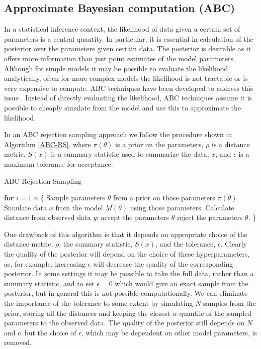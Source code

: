 \documentclass[twocolumn]{biophys}
\begin{document}
\subsection{Approximate Bayesian computation (ABC)}
In a statistical inference context, the likelihood of data given a certain set of parameters is a central quantity. 
In particular, it is essential in calculation of the posterior over the parameters given certain data. 
The posterior is desirable as it offers more information than just point estimates of the model parameters.
Although for simple models it may be possible to evaluate the likelihood analytically, often for more complex models the likelihood is not tractable or is very expensive to compute.  
ABC techniques have been developed to address this issue \cite{beaumont2002approximate}.
Instead of directly evaluating the likelihood, ABC techniques assume it is possible to cheaply simulate from the model and use this to approximate the likelihood.

In an ABC rejection sampling approach we follow the procedure shown in Algorithm \ref{ABC-RS}, where $\pi(\theta)$ is a prior on the parameters, $\rho$ is a distance metric, $S(x)$ is a summary statistic used to summarize the data, $x$, and $\epsilon$ is a maximum tolerance for acceptance. 
\begin{algorithm}
\caption{ABC Rejection Sampling}\label{ABC-RS}
\begin{algorithmic}[1]
\State \textbf{for} $i=1$  $n$  \{
\State Sample parameters $\theta$ from a prior on those parameters $\pi (\theta)$. 
\State Simulate data $x$ from the model $M(\theta)$ using those parameters. 
\State Calculate distance from observed data $y$: 
 accept the parameters $\theta$
\Else \hspace{2pt} reject the parameters $\theta$.
\EndIf
\State \}
\end{algorithmic}
\end{algorithm}

One drawback of this algorithm is that it depends on appropriate choice of the distance metric, $\rho$, the summary statistic, $S(x)$, and the tolerance, $\epsilon $. 
Clearly the quality of the posterior will depend on the choice of these hyperparameters, as, for example, increasing $\epsilon $ will decrease the quality of the corresponding posterior.
In some settings it may be possible to take the full data, rather than a summary statistic, and to set $\epsilon=0$ which would give an exact sample from the posterior, but in general this is not possible computationally. 
We can eliminate the importance of the tolerance to some extent by simulating $N$ samples from the prior, storing all the distances and keeping the closest $\alpha$ quantile of the sampled parameters to the observed data. 
The quality of the posterior still depends on $N$ and $\alpha$ but the choice of $\epsilon $, which may be dependent on other model parameters, is removed. 
\end{document}
